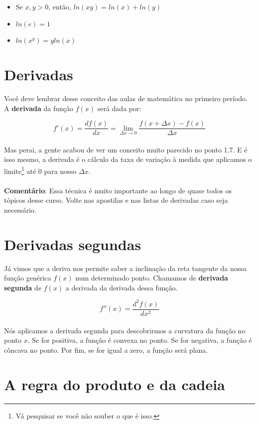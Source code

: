 \documentclass[a4paper,11pt,oneside]{book}
\theoremstyle{definition}
\theoremstyle{break}
\begin{document}
\begin{itemize}
 \item Se $x,y > 0$, então, $ ln(xy) = ln(x) + ln(y) $
 \item $ ln(e) = 1 $
 \item $ ln(x^y) = y ln(x) $
\end{itemize}

\section*{Derivadas}

Você deve lembrar desse conceito das aulas de matemática no primeiro período. A \textbf{derivada} da função $f(x)$ será dada por:

$$ f'(x) = \frac{df(x)}{dx} = \lim_{\Delta x \to 0} \frac{f(x + \Delta x) - f(x)}{\Delta x} $$
\\
Mas perai, a gente acabou de ver um conceito muito parecido no ponto 1.7. E é isso mesmo, a derivada é o cálculo da taxa de variação à medida que aplicamos o limite\footnote{Vá pesquisar se você não souber o que é isso.} até $0$ para nosso $\Delta x$.
\\
\\
\textbf{Comentário}: Essa técnica é muito importante ao longo de quase todos os tópicos desse curso. Volte nas apostilas e nas listas de derivadas caso seja necessário.

\section*{Derivadas segundas}

Já vimos que a deriva nos permite saber a inclinação da reta tangente da nossa função genérica $f(x)$ num determinado ponto. Chamamos de \textbf{derivada segunda} de $f(x)$ a derivada da derivada dessa função.

$$ f''(x) = \frac{d^2f(x)}{dx^2} $$
\\
Nós aplicamos a derivada segunda para descobrirmos a curvatura da função no ponto $x$. Se for positiva, a função é convexa no ponto. Se for negativa, a função é côncava no ponto. Por fim, se for igual a zero, a função será plana.

\section*{A regra do produto e da cadeia}
\end{document}
